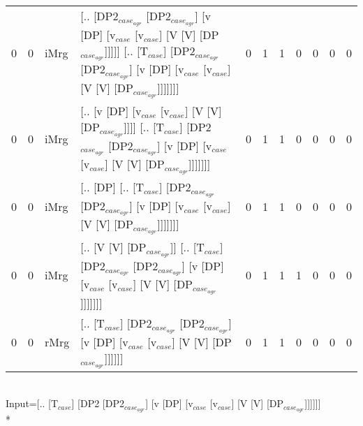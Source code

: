 \begin{tabularx}{\linewidth}{rrlXrrrrrrr}
   0 &   0 & iMrg & [.. [DP2$_{case_{agr}}$ [DP2$_{case_{agr}}$] [v [DP] [v$_{case}$ [v$_{case}$] [V [V] [DP$_{case_{agr}}$]]]]] [.. [T$_{case}$] [DP2$_{case_{agr}}$ [DP2$_{case_{agr}}$] [v [DP] [v$_{case}$ [v$_{case}$] [V [V] [DP$_{case_{agr}}$]]]]]]] &            0 &             1 &             1 &                  0 &              0 &              0 &            0 \\
   0 &   0 & iMrg & [.. [v [DP] [v$_{case}$ [v$_{case}$] [V [V] [DP$_{case_{agr}}$]]]] [.. [T$_{case}$] [DP2$_{case_{agr}}$ [DP2$_{case_{agr}}$] [v [DP] [v$_{case}$ [v$_{case}$] [V [V] [DP$_{case_{agr}}$]]]]]]]                               &            0 &             1 &             1 &                  0 &              0 &              0 &            0 \\
   0 &   0 & iMrg & [.. [DP] [.. [T$_{case}$] [DP2$_{case_{agr}}$ [DP2$_{case_{agr}}$] [v [DP] [v$_{case}$ [v$_{case}$] [V [V] [DP$_{case_{agr}}$]]]]]]]                                                                           &            0 &             1 &             1 &                  0 &              0 &              0 &            0 \\
   0 &   0 & iMrg & [.. [V [V] [DP$_{case_{agr}}$]] [.. [T$_{case}$] [DP2$_{case_{agr}}$ [DP2$_{case_{agr}}$] [v [DP] [v$_{case}$ [v$_{case}$] [V [V] [DP$_{case_{agr}}$]]]]]]]                                                          &            0 &             1 &             1 &                  1 &              0 &              0 &            0 \\
   0 &   0 & rMrg & [.. [T$_{case}$] [DP2$_{case_{agr}}$ [DP2$_{case_{agr}}$] [v [DP] [v$_{case}$ [v$_{case}$] [V [V] [DP$_{case_{agr}}$]]]]]]                                                                                     &            0 &             1 &             1 &                  0 &              0 &              0 &            0 \\
\hline
\end{tabularx}\endgroup\\
\begingroup\scriptsize Input=[.. [T$_{case}$] [DP2 [DP2$_{case_{agr}}$] [v [DP] [v$_{case}$ [v$_{case}$] [V [V] [DP$_{case_{agr}}$]]]]]]\\*
